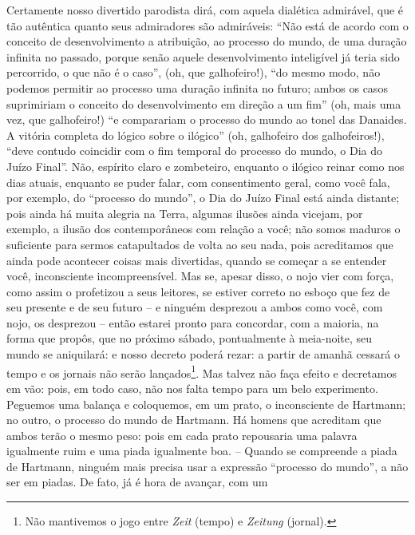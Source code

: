\begin{enumerate}
\begin{enumerate}
    Certamente nosso divertido parodista dirá, com aquela dialética
    admirável, que é tão autêntica quanto seus admiradores são
    admiráveis: ``Não está de acordo com o conceito de desenvolvimento a
    atribuição, ao processo do mundo, de uma duração infinita no
    passado, porque senão aquele desenvolvimento inteligível já teria
    sido percorrido, o que não é o caso'', (oh, que galhofeiro!), ``do
    mesmo modo, não podemos permitir ao processo uma duração infinita no
    futuro; ambos os casos suprimiriam o conceito do desenvolvimento em
    direção a um fim'' (oh, mais uma vez, que galhofeiro!) ``e
    comparariam o processo do mundo ao tonel das Danaides. A vitória
    completa do lógico sobre o ilógico'' (oh, galhofeiro dos
    galhofeiros!), ``deve contudo coincidir com o fim temporal do
    processo do mundo, o Dia do Juízo Final''. Não, espírito claro e
    zombeteiro, enquanto o ilógico reinar como nos dias atuais, enquanto
    se puder falar, com consentimento geral, como você fala, por
    exemplo, do ``processo do mundo'', o Dia do Juízo Final está ainda
    distante; pois ainda há muita alegria na Terra, algumas ilusões
    ainda vicejam, por exemplo, a ilusão dos contemporâneos com relação
    a você; não somos maduros o suficiente para sermos catapultados de
    volta ao seu nada, pois acreditamos que ainda pode acontecer coisas
    mais divertidas, quando se começar a se entender você, inconsciente
    incompreensível. Mas se, apesar disso, o nojo vier com força, como
    assim o profetizou a seus leitores, se estiver correto no esboço que
    fez de seu presente e de seu futuro -- e ninguém desprezou a ambos
    como você, com nojo, os desprezou -- então estarei pronto para
    concordar, com a maioria, na forma que propôs, que no próximo
    sábado, pontualmente à meia-noite, seu mundo se aniquilará: e nosso
    decreto poderá rezar: a partir de amanhã cessará o tempo e os
    jornais não serão lançados\footnote{Não mantivemos o jogo entre
      \emph{Zeit} (tempo) e \emph{Zeitung} (jornal).}. Mas talvez não
    faça efeito e decretamos em vão: pois, em todo caso, não nos falta
    tempo para um belo experimento. Peguemos uma balança e coloquemos,
    em um prato, o inconsciente de Hartmann; no outro, o processo do
    mundo de Hartmann. Há homens que acreditam que ambos terão o mesmo
    peso: pois em cada prato repousaria uma palavra igualmente ruim e
    uma piada igualmente boa. -- Quando se compreende a piada de
    Hartmann, ninguém mais precisa usar a expressão ``processo do
    mundo'', a não ser em piadas. De fato, já é hora de avançar, com um

\end{enumerate}
\end{enumerate}
